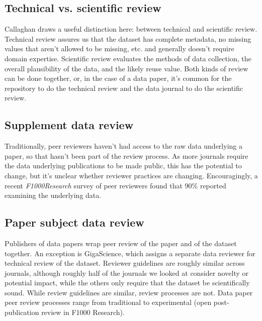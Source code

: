 \documentclass[10pt,a4paper,twocolumn]{article}
\begin{document}


\subsection*{Technical vs. scientific review}
Callaghan draws a useful distinction here: between technical and scientific review. \cite{callaghan_making_2012}
Technical review assures us that the dataset has complete metadata, no missing values that aren't allowed to be missing, etc. and generally doesn't require domain expertise. 
Scientific review evaluates the methods of data collection, the overall plausibility of the data, and the likely reuse value. 
Both kinds of review can be done together, or, in the case of a data paper, it's common for the repository to do the technical review and the data journal to do the scientific review.

\subsection*{Supplement data review}
Traditionally, peer reviewers haven't had access to the raw data underlying a paper, so that hasn't been part of the review process.
As more journals require the data underlying publications to be made public, this has the potential to change, but it's unclear whether reviewer practices are changing.
Encouragingly, a recent \emph{F1000Research} survey of peer reviewers found that 90\% reported examining the underlying data.

\subsection*{Paper subject data review}
Publishers of data papers wrap peer review of the paper and of the dataset together. 
An exception is GigaScience\cite{gigascience}, which assigns a separate data reviewer for technical review of the dataset. 
Reviewer guidelines are roughly similar across journals, although roughly half of the journals we looked at consider novelty or potential impact, while the others only require that the dataset be scientifically sound.
While review guidelines are similar, review processes are not. 
Data paper peer review processes range from traditional to experimental (open post-publication review in F1000 Research).
\end{document}
